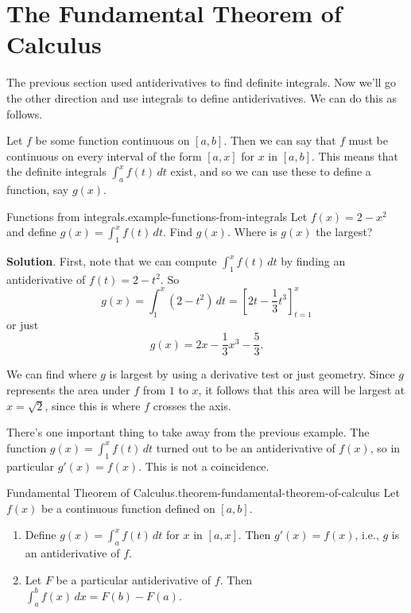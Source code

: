 \documentclass[10pt,]{book}
\numberwithin{equation}{section}
\begin{document}
\section[{The Fundamental Theorem of Calculus}]{The Fundamental Theorem of Calculus}\label{section-the-fundamental-theorem-of-calculus}
\hypertarget{p-460}{}%
The previous section used antiderivatives to find definite integrals. Now we'll go the other direction and use integrals to define antiderivatives. We can do this as follows.%
\par
\hypertarget{p-461}{}%
Let \(f\) be some function continuous on \([a,b]\). Then we can say that \(f\) must be continuous on every interval of the form \([a,x]\) for \(x\) in \([a,b]\). This means that the definite integrals \(\int_{a}^{x}f(t)\,dt\) exist, and so we can use these to define a function, say \(g(x)\).%
\begin{example}{Functions from integrals.}{example-functions-from-integrals}%
\hypertarget{p-462}{}%
Let \(f(x) = 2 - x^{2}\) and define \(g(x) = \int_{1}^{x}f(t)\,dt\). Find \(g(x)\). Where is \(g(x)\) the largest?%
\par\smallskip%
\noindent\textbf{Solution}.\hypertarget{solution-101}{}\quad%
\hypertarget{p-463}{}%
First, note that we can compute \(\int_{1}^{x}f(t)\,dt\) by finding an antiderivative of \(f(t) = 2 - t^{2}\). So%
\begin{equation*}
g(x) = \int_{1}^{x}(2-t^{2})\,dt = \left[2t-\frac{1}{3}t^{3}\right]_{t=1}^{x}
\end{equation*}
or just%
\begin{equation*}
g(x) = 2x - \frac{1}{3}x^{3} - \frac{5}{3}.
\end{equation*}
%
\par
\hypertarget{p-464}{}%
We can find where \(g\) is largest by using a derivative test or just geometry. Since \(g\) represents the area under \(f\) from \(1\) to \(x\), it follows that this area will be largest at \(x=\sqrt{2}\), since this is where \(f\) crosses the axis.%
\end{example}
\hypertarget{p-465}{}%
There's one important thing to take away from the previous example. The function \(g(x) = \int_{1}^{x}f(t)\,dt\) turned out to be an antiderivative of \(f(x)\), so in particular \(g'(x) = f(x)\). This is not a coincidence.%
\begin{theorem}{Fundamental Theorem of Calculus.}{}{theorem-fundamental-theorem-of-calculus}%
\hypertarget{p-466}{}%
Let \(f(x)\) be a continuous function defined on \([a,b]\).%
\leavevmode%
\begin{enumerate}
\item\hypertarget{li-40}{}Define \(g(x) = \int_{a}^{x}f(t)\,dt\) for \(x\) in \([a,x]\). Then \(g'(x) = f(x)\), i.e., \(g\) is an antiderivative of \(f\).%
\item\hypertarget{li-41}{}Let \(F\) be a particular antiderivative of \(f\). Then \(\int_{a}^{b}f(x)\,dx = F(b) - F(a).\)%
\end{enumerate}
\end{theorem}
\end{document}
